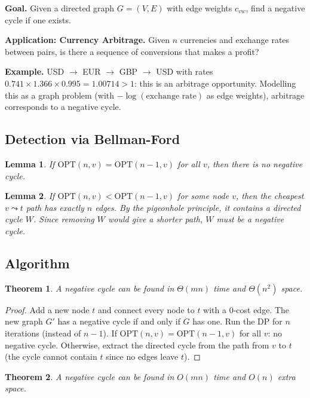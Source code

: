 \documentclass[12pt,a4paper]{report}
\newtheorem{theorem}{Theorem}
\newtheorem{lemma}{Lemma}
\begin{document}
\textbf{Goal.} Given a directed graph $G = (V, E)$ with edge weights $c_{vw}$, find a
negative cycle if one exists.

\textbf{Application: Currency Arbitrage.} Given $n$ currencies and exchange rates between
pairs, is there a sequence of conversions that makes a profit?

\textbf{Example.} USD $\to$ EUR $\to$ GBP $\to$ USD with rates $0.741 \times 1.366 \times
0.995 = 1.00714 > 1$: this is an arbitrage opportunity. Modelling this as a graph problem
(with $-\log(\text{exchange rate})$ as edge weights), arbitrage corresponds to a negative
cycle.

\subsection{Detection via Bellman-Ford}

\begin{lemma}
If $\text{OPT}(n, v) = \text{OPT}(n-1, v)$ for all $v$, then there is no negative cycle.
\end{lemma}

\begin{lemma}
If $\text{OPT}(n, v) < \text{OPT}(n-1, v)$ for some node $v$, then the cheapest $v \leadsto t$
path has exactly $n$ edges. By the pigeonhole principle, it contains a directed cycle $W$.
Since removing $W$ would give a shorter path, $W$ must be a negative cycle.
\end{lemma}

\subsection{Algorithm}

\begin{theorem}
A negative cycle can be found in $\Theta(mn)$ time and $\Theta(n^2)$ space.
\end{theorem}

\begin{proof}
Add a new node $t$ and connect every node to $t$ with a 0-cost edge. The new graph $G'$ has
a negative cycle if and only if $G$ has one. Run the DP for $n$ iterations (instead of $n-1$).
If $\text{OPT}(n, v) = \text{OPT}(n-1, v)$ for all $v$: no negative cycle. Otherwise,
extract the directed cycle from the path from $v$ to $t$ (the cycle cannot contain $t$ since
no edges leave $t$).
\end{proof}

\begin{theorem}
A negative cycle can be found in $O(mn)$ time and $O(n)$ extra space.
\end{theorem}
\end{document}
